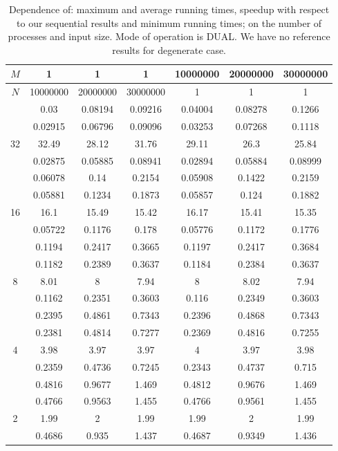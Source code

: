 \begin{table}[ht]
\centering
\begin{tabular}{c|c|c|c|c|c|c|}
\hline
$M$ & 1 & 1 & 1 & 10000000 & 20000000 & 30000000 \\
\hline
$N$ & 10000000 & 20000000 & 30000000 & 1 & 1 & 1 \\
\hline
 & 0.03 & 0.08194 & 0.09216 & 0.04004 & 0.08278 & 0.1266 \\
 & 0.02915 & 0.06796 & 0.09096 & 0.03253 & 0.07268 & 0.1118 \\
32 & 32.49 & 28.12 & 31.76 & 29.11 & 26.3 & 25.84 \\
 & 0.02875 & 0.05885 & 0.08941 & 0.02894 & 0.05884 & 0.08999 \\
\hline
 & 0.06078 & 0.14 & 0.2154 & 0.05908 & 0.1422 & 0.2159 \\
 & 0.05881 & 0.1234 & 0.1873 & 0.05857 & 0.124 & 0.1882 \\
16 & 16.1 & 15.49 & 15.42 & 16.17 & 15.41 & 15.35 \\
 & 0.05722 & 0.1176 & 0.178 & 0.05776 & 0.1172 & 0.1776 \\
\hline
 & 0.1194 & 0.2417 & 0.3665 & 0.1197 & 0.2417 & 0.3684 \\
 & 0.1182 & 0.2389 & 0.3637 & 0.1184 & 0.2384 & 0.3637 \\
8 & 8.01 & 8 & 7.94 & 8 & 8.02 & 7.94 \\
 & 0.1162 & 0.2351 & 0.3603 & 0.116 & 0.2349 & 0.3603 \\
\hline
 & 0.2395 & 0.4861 & 0.7343 & 0.2396 & 0.4868 & 0.7343 \\
 & 0.2381 & 0.4814 & 0.7277 & 0.2369 & 0.4816 & 0.7255 \\
4 & 3.98 & 3.97 & 3.97 & 4 & 3.97 & 3.98 \\
 & 0.2359 & 0.4736 & 0.7245 & 0.2343 & 0.4737 & 0.715 \\
\hline
 & 0.4816 & 0.9677 & 1.469 & 0.4812 & 0.9676 & 1.469 \\
 & 0.4766 & 0.9563 & 1.455 & 0.4766 & 0.9561 & 1.455 \\
2 & 1.99 & 2 & 1.99 & 1.99 & 2 & 1.99 \\
 & 0.4686 & 0.935 & 1.437 & 0.4687 & 0.9349 & 1.436 \\
\hline
\end{tabular}
\caption{Dependence of: maximum and average running times, speedup with respect to our sequential results and minimum running times; on the number of processes and input size. Mode of operation is DUAL. We have no reference results for degenerate case.}
\end{table}

